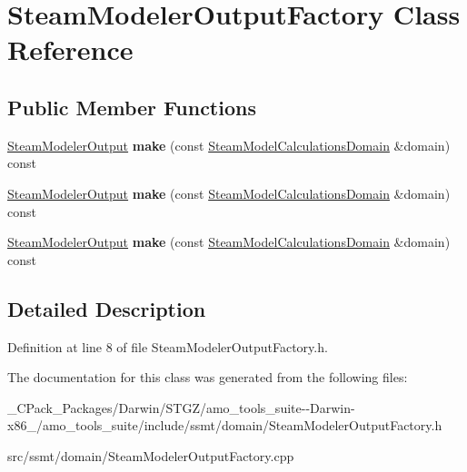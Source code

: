 \hypertarget{class_steam_modeler_output_factory}{}\section{Steam\+Modeler\+Output\+Factory Class Reference}
\label{class_steam_modeler_output_factory}
\subsection*{Public Member Functions}
\begin{DoxyCompactItemize}
\item 
\mbox{\label{class_steam_modeler_output_factory_a728aa2d44b46d0264470d13d42288cf5}} 
\hyperlink{class_steam_modeler_output}{Steam\+Modeler\+Output} {\bfseries make} (const \hyperlink{class_steam_model_calculations_domain}{Steam\+Model\+Calculations\+Domain} \&domain) const
\item 
\mbox{\label{class_steam_modeler_output_factory_a728aa2d44b46d0264470d13d42288cf5}} 
\hyperlink{class_steam_modeler_output}{Steam\+Modeler\+Output} {\bfseries make} (const \hyperlink{class_steam_model_calculations_domain}{Steam\+Model\+Calculations\+Domain} \&domain) const
\item 
\mbox{\label{class_steam_modeler_output_factory_a728aa2d44b46d0264470d13d42288cf5}} 
\hyperlink{class_steam_modeler_output}{Steam\+Modeler\+Output} {\bfseries make} (const \hyperlink{class_steam_model_calculations_domain}{Steam\+Model\+Calculations\+Domain} \&domain) const
\end{DoxyCompactItemize}


\subsection{Detailed Description}


Definition at line 8 of file Steam\+Modeler\+Output\+Factory.\+h.



The documentation for this class was generated from the following files\+:\begin{DoxyCompactItemize}
\item 
\+\_\+\+C\+Pack\+\_\+\+Packages/\+Darwin/\+S\+T\+G\+Z/amo\+\_\+tools\+\_\+suite-\/-\/\+Darwin-\/x86\+\_/amo\+\_\+tools\+\_\+suite/include/ssmt/domain/Steam\+Modeler\+Output\+Factory.\+h\item 
src/ssmt/domain/Steam\+Modeler\+Output\+Factory.\+cpp\end{DoxyCompactItemize}
